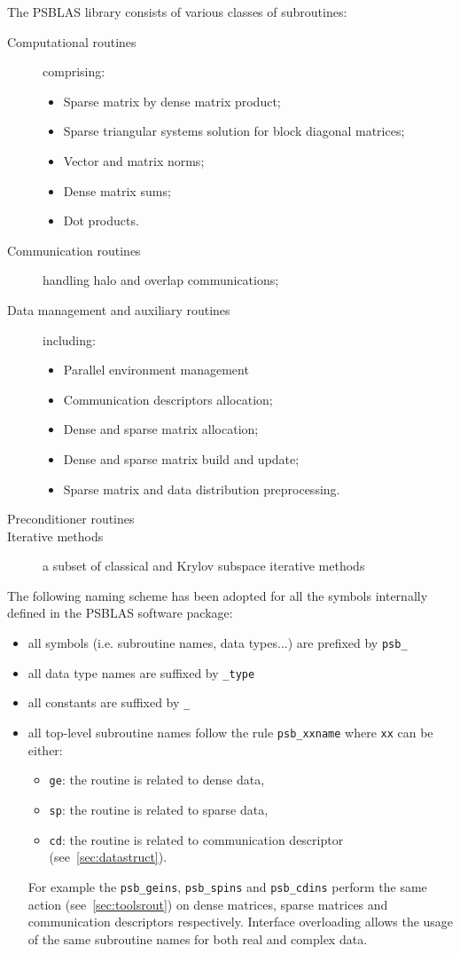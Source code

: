 The PSBLAS library consists of various classes of subroutines:
\begin{description}
\item[Computational routines] comprising:
\begin{itemize}
\item Sparse matrix by dense matrix product; 
\item Sparse triangular
systems solution for block diagonal matrices;
\item Vector and matrix norms;
\item Dense matrix sums;
\item Dot products.
\end{itemize} 
\item[Communication routines] handling halo and overlap
  communications;
\item[Data management and auxiliary routines] including:
\begin{itemize}
\item Parallel environment management
\item Communication descriptors allocation;
\item Dense and sparse matrix allocation;
\item Dense and sparse matrix build and update;
\item Sparse matrix and data distribution preprocessing.
\end{itemize} 
\item[Preconditioner routines]
\item[Iterative methods] a subset of classical and Krylov subspace iterative
  methods
\end{description}
The following naming scheme has been adopted for all the symbols
internally defined in the PSBLAS software package:
\begin{itemize}
\item all symbols (i.e. subroutine names, data types...) are
  prefixed by \verb|psb_| 
\item all data type names are suffixed by \verb|_type|
\item all constants are suffixed by \verb|_|
\item all top-level subroutine names follow the rule \verb|psb_xxname| where
  \verb|xx| can be either:
  \begin{itemize}
  \item \verb|ge|: the routine is related to dense data, 
  \item \verb|sp|: the routine is related to sparse data, 
  \item \verb|cd|: the routine is related to communication descriptor
        (see~\ref{sec:datastruct}).
  \end{itemize}
  For example the \verb|psb_geins|, \verb|psb_spins| and
  \verb|psb_cdins| perform the same action (see~\ref{sec:toolsrout}) on
  dense matrices, sparse matrices and communication descriptors
  respectively.
  Interface overloading allows the usage of the same subroutine
  names  for both real and complex data.
\end{itemize}
